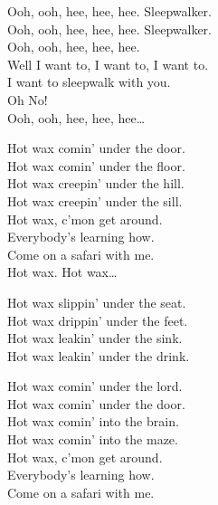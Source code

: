 Ooh, ooh, hee, hee, hee. Sleepwalker. \\
Ooh, ooh, hee, hee, hee. Sleepwalker. \\
Ooh, ooh, hee, hee, hee. \\
Well I want to, I want to, I want to. \\
I want to sleepwalk with you. \\
Oh No! \\

Ooh, ooh, hee, hee, hee… \\





Hot wax comin' under the door. \\
Hot wax comin' under the floor. \\
Hot wax creepin' under the hill. \\
Hot wax creepin' under the sill. \\

Hot wax, c'mon get around. \\
Everybody's learning how. \\
Come on a safari with me. \\

Hot wax. Hot wax… \\


Hot wax slippin' under the seat. \\
Hot wax drippin' under the feet. \\
Hot wax leakin' under the sink. \\
Hot wax leakin' under the drink. \\


Hot wax comin' under the lord. \\
Hot wax comin' under the door. \\
Hot wax comin' into the brain. \\
Hot wax comin' into the maze. \\

Hot wax, c'mon get around. \\
Everybody's learning how. \\
Come on a safari with me. \\

